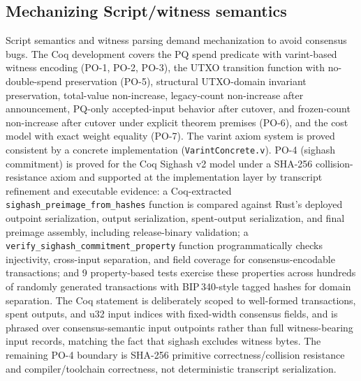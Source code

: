 \documentclass[11pt]{article}
\begin{document}
\subsection{Mechanizing Script/witness semantics}
Script semantics and witness parsing demand mechanization to avoid consensus bugs.
The Coq development covers the PQ spend predicate with varint-based witness encoding (PO-1, PO-2, PO-3), the UTXO transition function with no-double-spend preservation (PO-5), structural UTXO-domain invariant preservation, total-value non-increase, legacy-count non-increase after announcement, PQ-only accepted-input behavior after cutover, and frozen-count non-increase after cutover under explicit theorem premises (PO-6), and the cost model with exact weight equality (PO-7).
The varint axiom system is proved consistent by a concrete implementation (\texttt{VarintConcrete.v}).
PO-4 (sighash commitment) is proved for the Coq Sighash v2 model under a SHA-256 collision-resistance axiom and supported at the implementation layer by transcript refinement and executable evidence: a Coq-extracted \texttt{sighash\_preimage\_from\_hashes} function is compared against Rust's deployed outpoint serialization, output serialization, spent-output serialization, and final preimage assembly, including release-binary validation; a \texttt{verify\_sighash\_commitment\_property} function programmatically checks injectivity, cross-input separation, and field coverage for consensus-encodable transactions; and 9 property-based tests exercise these properties across hundreds of randomly generated transactions with BIP\,340-style tagged hashes for domain separation.
The Coq statement is deliberately scoped to well-formed transactions, spent outputs, and u32 input indices with fixed-width consensus fields, and is phrased over consensus-semantic input outpoints rather than full witness-bearing input records, matching the fact that sighash excludes witness bytes.
The remaining PO-4 boundary is SHA-256 primitive correctness/collision resistance and compiler/toolchain correctness, not deterministic transcript serialization.
\end{document}
